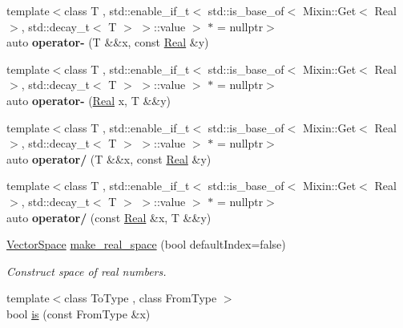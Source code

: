 \begin{DoxyCompactItemize}
\item 
\hypertarget{namespaceSpacy_a0ce5976cd9ab32a6eecaa92fc3ea803a}{{\footnotesize template$<$class T , std\-::enable\-\_\-if\-\_\-t$<$ std\-::is\-\_\-base\-\_\-of$<$ Mixin\-::\-Get$<$ Real $>$, std\-::decay\-\_\-t$<$ T $>$ $>$\-::value $>$ $\ast$  = nullptr$>$ }\\auto {\bfseries operator-\/} (\-T \&\&x, const \hyperlink{classSpacy_1_1Real}{\-Real} \&y)}\label{namespaceSpacy_a0ce5976cd9ab32a6eecaa92fc3ea803a}

\item 
\hypertarget{namespaceSpacy_a92fe6ff3c620feb4c8299e6ac3959a42}{{\footnotesize template$<$class T , std\-::enable\-\_\-if\-\_\-t$<$ std\-::is\-\_\-base\-\_\-of$<$ Mixin\-::\-Get$<$ Real $>$, std\-::decay\-\_\-t$<$ T $>$ $>$\-::value $>$ $\ast$  = nullptr$>$ }\\auto {\bfseries operator-\/} (\hyperlink{classSpacy_1_1Real}{\-Real} x, \-T \&\&y)}\label{namespaceSpacy_a92fe6ff3c620feb4c8299e6ac3959a42}

\item 
\hypertarget{namespaceSpacy_aeec0910b94a07ae8dfe79f971ea8425a}{{\footnotesize template$<$class T , std\-::enable\-\_\-if\-\_\-t$<$ std\-::is\-\_\-base\-\_\-of$<$ Mixin\-::\-Get$<$ Real $>$, std\-::decay\-\_\-t$<$ T $>$ $>$\-::value $>$ $\ast$  = nullptr$>$ }\\auto {\bfseries operator/} (\-T \&\&x, const \hyperlink{classSpacy_1_1Real}{\-Real} \&y)}\label{namespaceSpacy_aeec0910b94a07ae8dfe79f971ea8425a}

\item 
\hypertarget{namespaceSpacy_af180e266f73b104cb351ec67778b8cfd}{{\footnotesize template$<$class T , std\-::enable\-\_\-if\-\_\-t$<$ std\-::is\-\_\-base\-\_\-of$<$ Mixin\-::\-Get$<$ Real $>$, std\-::decay\-\_\-t$<$ T $>$ $>$\-::value $>$ $\ast$  = nullptr$>$ }\\auto {\bfseries operator/} (const \hyperlink{classSpacy_1_1Real}{\-Real} \&x, \-T \&\&y)}\label{namespaceSpacy_af180e266f73b104cb351ec67778b8cfd}

\item 
\hypertarget{namespaceSpacy_a35f24f04df875f0fd7205857fd00cca2}{\hyperlink{classSpacy_1_1VectorSpace}{\-Vector\-Space} \hyperlink{namespaceSpacy_a35f24f04df875f0fd7205857fd00cca2}{make\-\_\-real\-\_\-space} (bool default\-Index=false)}\label{namespaceSpacy_a35f24f04df875f0fd7205857fd00cca2}

\begin{DoxyCompactList}\small\item\em \-Construct space of real numbers. \end{DoxyCompactList}\item 
\hypertarget{namespaceSpacy_ae44bfd08fa77272bab4149665b26233a}{{\footnotesize template$<$class To\-Type , class From\-Type $>$ }\\bool \hyperlink{namespaceSpacy_ae44bfd08fa77272bab4149665b26233a}{is} (const \-From\-Type \&x)}\label{namespaceSpacy_ae44bfd08fa77272bab4149665b26233a}


\end{DoxyCompactItemize}
